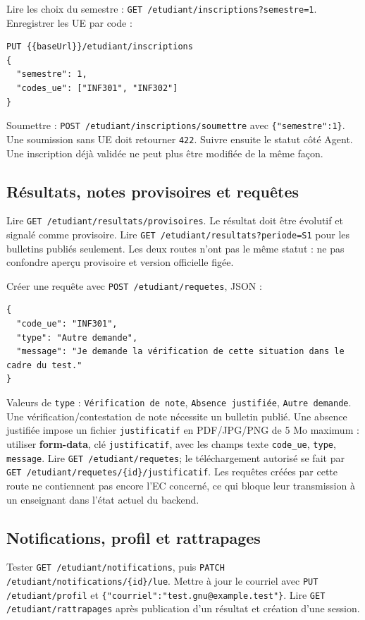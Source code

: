 \documentclass[10pt,a4paper]{article}
\newcommand{\method}[1]{\texttt{\small #1}}
\begin{document}
Lire les choix du semestre : \method{GET /etudiant/inscriptions?semestre=1}. Enregistrer les UE par code :
\begin{lstlisting}
PUT {{baseUrl}}/etudiant/inscriptions
{
  "semestre": 1,
  "codes_ue": ["INF301", "INF302"]
}
\end{lstlisting}

Soumettre : \method{POST /etudiant/inscriptions/soumettre} avec \texttt{\{"semestre":1\}}. Une soumission sans UE doit retourner \texttt{422}. Suivre ensuite le statut côté Agent. Une inscription déjà validée ne peut plus être modifiée de la même façon.

\subsection{Résultats, notes provisoires et requêtes}

Lire \method{GET /etudiant/resultats/provisoires}. Le résultat doit être évolutif et signalé comme provisoire. Lire \method{GET /etudiant/resultats?periode=S1} pour les bulletins publiés seulement. Les deux routes n’ont pas le même statut : ne pas confondre aperçu provisoire et version officielle figée.

Créer une requête avec \method{POST /etudiant/requetes}, JSON :
\begin{lstlisting}
{
  "code_ue": "INF301",
  "type": "Autre demande",
  "message": "Je demande la vérification de cette situation dans le cadre du test."
}
\end{lstlisting}

Valeurs de \texttt{type} : \texttt{Vérification de note}, \texttt{Absence justifiée}, \texttt{Autre demande}. Une vérification/contestation de note nécessite un bulletin publié. Une absence justifiée impose un fichier \texttt{justificatif} en PDF/JPG/PNG de 5 Mo maximum : utiliser \textbf{form-data}, clé \texttt{justificatif}, avec les champs texte \texttt{code\_ue}, \texttt{type}, \texttt{message}. Lire \method{GET /etudiant/requetes}; le téléchargement autorisé se fait par \method{GET /etudiant/requetes/\{id\}/justificatif}. Les requêtes créées par cette route ne contiennent pas encore l’EC concerné, ce qui bloque leur transmission à un enseignant dans l’état actuel du backend.

\subsection{Notifications, profil et rattrapages}

Tester \method{GET /etudiant/notifications}, puis \method{PATCH /etudiant/notifications/\{id\}/lue}. Mettre à jour le courriel avec \method{PUT /etudiant/profil} et \texttt{\{"courriel":"test.gnu@example.test"\}}. Lire \method{GET /etudiant/rattrapages} après publication d’un résultat et création d’une session.
\end{document}
